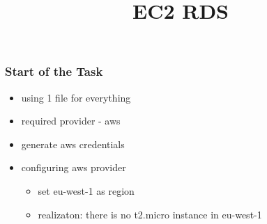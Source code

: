 \documentclass{beamer}
\title{EC2 RDS}
\begin{document}
\date{}
\frame{\titlepage}

	\begin{frame}
		\frametitle{Start of the Task}
		\begin{itemize}
		\item using 1 file for everything
		\item required provider - aws
		\item generate aws credentials
		\item configuring aws provider
			\begin{itemize}
				\item set eu-west-1 as region
				\item realizaton: there is no t2.micro instance in eu-west-1
			\end{itemize}
		\end{itemize}
	\end{frame}
	
\end{document}
